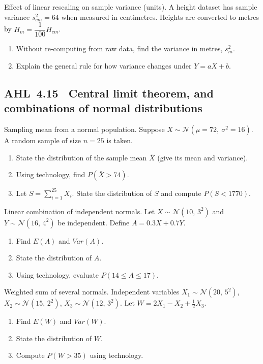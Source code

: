 \documentclass[11pt]{article}
\def\textbf#1{#1}%
\def\mathbb#1{#1}%
\def\mathrm#1{#1}%
\newcommand{\tocsubsection}[1]{\subsection{#1}}
\newcounter{question}
\begin{document}
\begin{question}
\textbf{Effect of linear rescaling on sample variance (units).}
A height dataset has sample variance $s^2_{cm}=64$ when measured in centimetres.
Heights are converted to metres by $H_m=\dfrac{1}{100}H_{cm}$.
\begin{enumerate}
  \item Without re-computing from raw data, find the variance in metres, $s^2_{m}$.
  \item Explain the general rule for how variance changes under $Y=aX+b$.
\end{enumerate}
\end{question}


\tocsubsection{AHL 4.15 \; Central limit theorem, and combinations of normal distributions}


\begin{question}
\textbf{Sampling mean from a normal population.}
Suppose $X\sim\mathcal N(\mu=72,\ \sigma^2=16)$. A random sample of size $n=25$ is taken.
\begin{enumerate}
  \item State the distribution of the sample mean $\bar X$ (give its mean and variance).
  \item Using technology, find $P(\bar X>74)$.
  \item Let $S=\sum_{i=1}^{25} X_i$. State the distribution of $S$ and compute $P(S<1770)$.
\end{enumerate}
\end{question}

\begin{question}
\textbf{Linear combination of independent normals.}
Let $X\sim\mathcal N(10,\,3^2)$ and $Y\sim\mathcal N(16,\,4^2)$ be independent. Define $A=0.3X+0.7Y$.
\begin{enumerate}
  \item Find $\mathbb E(A)$ and $\mathrm{Var}(A)$.
  \item State the distribution of $A$.
  \item Using technology, evaluate $P(14\le A\le 17)$.
\end{enumerate}
\end{question}

\begin{question}
\textbf{Weighted sum of several normals.}
Independent variables $X_1\sim\mathcal N(20,\,5^2)$, $X_2\sim\mathcal N(15,\,2^2)$, $X_3\sim\mathcal N(12,\,3^2)$.
Let $W=2X_1-X_2+\tfrac12 X_3$.
\begin{enumerate}
  \item Find $\mathbb E(W)$ and $\mathrm{Var}(W)$.
  \item State the distribution of $W$.
  \item Compute $P(W>35)$ using technology.
\end{enumerate}
\end{question}
\end{document}
